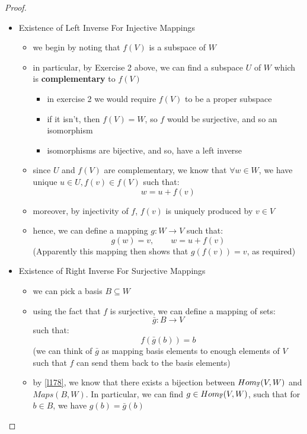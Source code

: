 \documentclass{exam}
\begin{document}
\begin{proof}

\begin{itemize}
    \item Existence of Left Inverse For Injective Mappings
    \begin{itemize}
        \item we begin by noting that $f(V)$ is a subspace of $W$
        \item in particular, by Exercise 2 above, we can find a subspace $U$ of $W$ which is \textbf{complementary} to $f(V)$ 
        \begin{itemize}
            \item in exercise 2 we would require $f(V)$ to be a proper subspace
            \item if it isn't, then $f(V) = W$, so $f$ would be surjective, and so an isomorphism
            \item isomorphisms are bijective, and so, have a left inverse
        \end{itemize}
        \item since $U$ and $f(V)$ are complementary, we know that $\forall w \in W$, we have unique $u \in U, f(v) \in f(V)$ such that:
        \[
        w = u + f(v)
        \]
        \item moreover, by injectivity of $f$, $f(v)$ is uniquely produced by $v \in V$
        \item hence, we can define a mapping $g : W \to V$ such that:
        \[
        g(w) = v, \qquad w = u + f(v)
        \]
        (Apparently this mapping then shows that $g(f(v)) = v$, as required)
    \end{itemize}
    \item Existence of Right Inverse For Surjective Mappings
    \begin{itemize}
        \item we can pick a basis $B \subseteq W$
        \item using the fact that $f$ is surjective, we can define a mapping of sets:
        \[
        \bar{g} : B \to V
        \]
        such that:
        \[
        f(\bar{g}(b)) = b
        \]
        (we can think of $\bar{g}$ as mapping basis elements to enough elements of $V$ such that $f$ can send them back to the basis elements)
        \item by \eqref{l178}, we know that there exists a bijection between $Hom_{\mathbb{F}}(V,W)$ and $Maps(B,W)$. In particular, we can find $g \in Hom_{\mathbb{F}}(V,W)$, such that for $b \in B$, we have $g(b) = \bar{g}(b)$

\end{itemize}
\end{itemize}
\end{proof}
\end{document}
